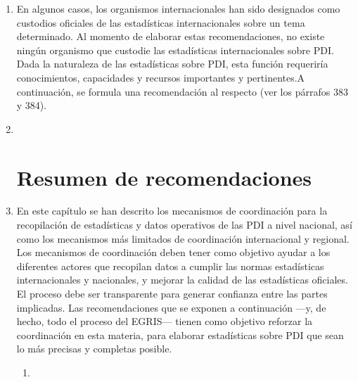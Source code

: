 \documentclass[
]{book}
\begin{document}
\begin{enumerate}
\def\labelenumi{\arabic{enumi}.}
\item
  En algunos casos, los organismos internacionales han sido designados como custodios oficiales de las estadísticas internacionales sobre un tema determinado. Al momento de elaborar estas recomendaciones, no existe ningún organismo que custodie las estadísticas internacionales sobre PDI. Dada la naturaleza de las estadísticas sobre PDI, esta función requeriría conocimientos, capacidades y recursos importantes y pertinentes.A continuación, se formula una recomendación al respecto (ver los párrafos 383 y 384).
\item ~
  \hypertarget{resumen-de-recomendaciones-4}{%
  \section{Resumen de recomendaciones}\label{resumen-de-recomendaciones-4}}
\item
  En este capítulo se han descrito los mecanismos de coordinación para la recopilación de estadísticas y datos operativos de las PDI a nivel nacional, así como los mecanismos más limitados de coordinación internacional y regional. Los mecanismos de coordinación deben tener como objetivo ayudar a los diferentes actores que recopilan datos a cumplir las normas estadísticas internacionales y nacionales, y mejorar la calidad de las estadísticas oficiales. El proceso debe ser transparente para generar confianza entre las partes implicadas. Las recomendaciones que se exponen a continuación ---y, de hecho, todo el proceso del EGRIS--- tienen como objetivo reforzar la coordinación en esta materia, para elaborar estadísticas sobre PDI que sean lo más precisas y completas posible.

  \begin{enumerate}
  \def\labelenumii{\arabic{enumii}.}
  \item ~
    \hypertarget{mejorar-la-coordinaciuxf3n-estaduxedstica-nacional}{%
}
\end{enumerate}
\end{enumerate}
\end{document}
